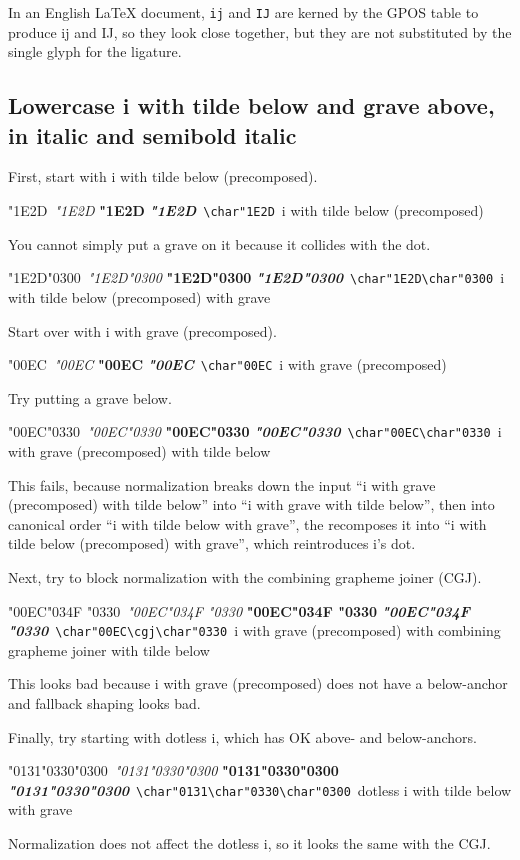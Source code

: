 \documentclass[landscape]{article}
\newcommand{\ribbiline}[1]{#1\ 
	{\itshape #1}
	{\bfseries #1}
	{\itshape\bfseries #1}}
\newcommand{\cgj}{\char"034F }
\begin{document}
In an English LaTeX document, \verb|ij| and \verb|IJ| are kerned by the GPOS table to produce ij and IJ, 
so they look close together, but they are not substituted by the single glyph for the ligature.

\subsection*{Lowercase i with tilde below and grave above, in italic and semibold italic}

First, start with i with tilde below (precomposed).

\ribbiline{\char"1E2D}\
\verb|\char"1E2D|\
i with tilde below (precomposed)

You cannot simply put a grave on it because it collides with the dot.

\ribbiline{\char"1E2D\char"0300}\
\verb|\char"1E2D\char"0300|\
i with tilde below (precomposed) with grave

Start over with i with grave (precomposed).

\ribbiline{\char"00EC}\
\verb|\char"00EC|\
i with grave (precomposed) 

Try putting a grave below.

\ribbiline{\char"00EC\char"0330}\
\verb|\char"00EC\char"0330|\
i with grave (precomposed) with tilde below  

This fails, because normalization breaks down the input 
``i with grave (precomposed) with tilde below'' into 
``i with grave with tilde below'', then into canonical order 
``i with tilde below with grave'', the recomposes it into
``i with tilde below (precomposed) with grave'', which reintroduces i's dot.

Next, try to block normalization with the combining grapheme joiner (CGJ).

\ribbiline{\char"00EC\cgj\char"0330}\ 
\verb|\char"00EC\cgj\char"0330|\ 
i with grave (precomposed) with combining grapheme joiner with tilde below 

This looks bad because i with grave (precomposed) does not have a below-anchor and fallback shaping looks bad.

Finally, try starting with dotless i, which has OK above- and below-anchors. 

\ribbiline{\char"0131\char"0330\char"0300}\ 
\verb|\char"0131\char"0330\char"0300|\
dotless i with tilde below with grave 

Normalization does not affect the dotless i, so it looks the same with the CGJ.
\end{document}
